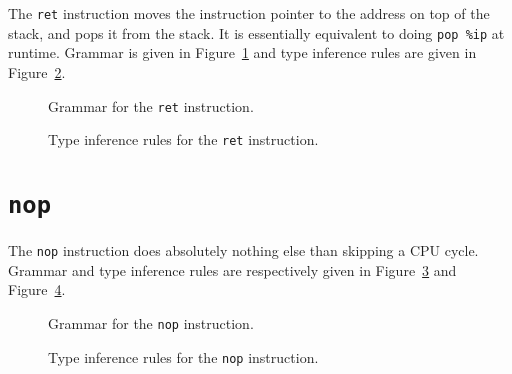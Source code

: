 The \texttt{ret} instruction moves the instruction pointer to the address on top of the stack, and pops it from the stack.
It is essentially equivalent to doing \texttt{pop \%ip} at runtime.
Grammar is given in Figure~\ref{fig:nstar-instructionset-ret-grammar} and type inference rules are given in Figure~\ref{fig:nstar-instructionset-ret-typerules}.

\begin{figure}[H]
  \centering


  \caption{Grammar for the \texttt{ret} instruction.}
  \label{fig:nstar-instructionset-ret-grammar}
\end{figure}

\begin{figure}[H]
  \centering

  \begin{prooftree}
  \end{prooftree}

  \caption{Type inference rules for the \texttt{ret} instruction.}
  \label{fig:nstar-instructionset-ret-typerules}
\end{figure}

\section{\texttt{nop}}\label{sec:nstar-instructionset-nop}

The \texttt{nop} instruction does absolutely nothing else than skipping a CPU cycle.
Grammar and type inference rules are respectively given in Figure~\ref{fig:nstar-instructionset-nop-grammar} and Figure~\ref{fig:nstar-instructionset-nop-typerules}.

\begin{figure}[H]
  \centering


  \caption{Grammar for the \texttt{nop} instruction.}
  \label{fig:nstar-instructionset-nop-grammar}
\end{figure}

\begin{figure}[H]
  \centering

  \begin{prooftree}
  \end{prooftree}

  \caption{Type inference rules for the \texttt{nop} instruction.}
  \label{fig:nstar-instructionset-nop-typerules}
\end{figure}

